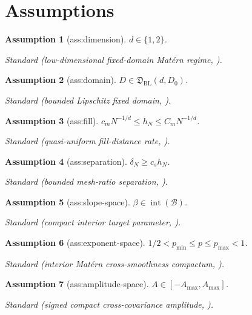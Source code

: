 \documentclass{article}
\newtheorem{assumption}{Assumption}
\begin{document}
\section{Assumptions}

\begin{assumption}[ass:dimension]\label{ass:dimension}
\(d\in\{1,2\}\).
\par\smallskip\noindent\emph{Standard} (low-dimensional fixed-domain Mat\'ern regime, \cite{Zhang2004}).
\end{assumption}

\begin{assumption}[ass:domain]\label{ass:domain}
\(D\in\mathfrak D_{\mathrm{BL}}(d,D_0)\).
\par\smallskip\noindent\emph{Standard} (bounded Lipschitz fixed domain, \cite{TuoWang2020}).
\end{assumption}

\begin{assumption}[ass:fill]\label{ass:fill}
\(c_mN^{-1/d}\le h_N\le C_mN^{-1/d}\).
\par\smallskip\noindent\emph{Standard} (quasi-uniform fill-distance rate, \cite{TuoWang2020}).
\end{assumption}

\begin{assumption}[ass:separation]\label{ass:separation}
\(\delta_N\ge c_sh_N\).
\par\smallskip\noindent\emph{Standard} (bounded mesh-ratio separation, \cite{TuoWang2020}).
\end{assumption}

\begin{assumption}[ass:slope-space]\label{ass:slope-space}
\(\beta\in\operatorname{int}(\mathcal B)\).
\par\smallskip\noindent\emph{Standard} (compact interior target parameter, \cite{AndrewsMikusheva2016}).
\end{assumption}

\begin{assumption}[ass:exponent-space]\label{ass:exponent-space}
\(1/2<p_{\min}\le p\le p_{\max}<1\).
\par\smallskip\noindent\emph{Standard} (interior Mat\'ern cross-smoothness compactum, \cite{GneitingKleiberSchlather2010}).
\end{assumption}

\begin{assumption}[ass:amplitude-space]\label{ass:amplitude-space}
\(A\in[-A_{\max},A_{\max}]\).
\par\smallskip\noindent\emph{Standard} (signed compact cross-covariance amplitude, \cite{GneitingKleiberSchlather2010}).
\end{assumption}
\end{document}

